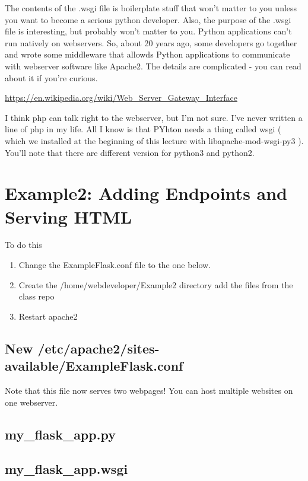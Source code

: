 \documentclass[10pt]{article}
\begin{document}
The contents of the .wsgi file is boilerplate stuff that won't matter to you unless you want to become a serious python developer. Also, the purpose of the .wsgi file is interesting, but probably won't matter to you. Python applications can't run natively on webservers. So, about 20 years ago, some developers go together and wrote some middleware that allowds Python applications to communicate with webserver software like Apache2. The details are complicated - you can read about it if you're curious. 

\url{https://en.wikipedia.org/wiki/Web_Server_Gateway_Interface}

I think php can talk right to the webserver, but I'm not sure. I've never written a line of php in my life. All I know is that PYhton needs a thing called wsgi ( which we installed at the beginning of this lecture with libapache-mod-wsgi-py3 ). You'll note that there are different version for python3 and python2.

\section{Example2: Adding Endpoints and Serving HTML}
To do this
\begin{enumerate}
\item Change the ExampleFlask.conf file to the one below.
\item Create the /home/webdeveloper/Example2 directory add the files from the class repo
\item Restart apache2
\end{enumerate}

\subsection{New /etc/apache2/sites-available/ExampleFlask.conf}
Note that this file now serves two webpages! You can host multiple websites on one webserver.


\subsection{my\_flask\_app.py}


\subsection{my\_flask\_app.wsgi}

\end{document}
